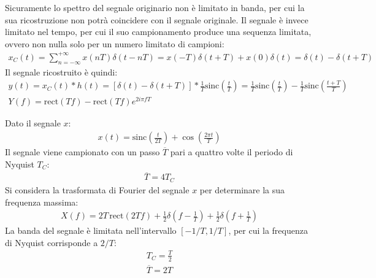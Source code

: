 \documentclass{article}
\begin{document}
Sicuramente lo spettro del segnale originario non è limitato in banda, per cui la sua ricostruzione non potrà coincidere con il segnale originale. Il segnale è invece limitato 
nel tempo, per cui il suo campionamento produce una sequenza limitata, ovvero non nulla solo per un numero limitato di campioni:
\begin{gather*}
    x_C(t)=\displaystyle\sum_{n=-\infty}^{+\infty}x(nT)\delta(t-nT)=x(-T)\delta(t+T)+x(0)\delta(t)=\delta(t)-\delta(t+T)
\end{gather*}
Il segnale ricostruito è quindi:
\begin{gather}
    y(t)=x_C(t)*h(t)=\left[\delta(t)-\delta(t+T)\right]*\frac{1}{T}\mbox{sinc}\left(\frac{t}{T}\right)=\frac{1}{T}\mbox{sinc}\left(\frac{t}{T}\right)-\frac{1}{T}\mbox{sinc}\left(\frac{t+T}{T}\right)\\
    Y(f)=\mbox{rect}(Tf)-\mbox{rect}(Tf)e^{2i\pi fT}
\end{gather}


Dato il segnale $x$:
\begin{gather*}
    x(t)=\mbox{sinc}\left(\displaystyle\frac{t}{2T}\right)+\cos\left(\frac{2\pi t}{T}\right)
\end{gather*}
Il segnale viene campionato con un passo $\overline{T}$ pari a quattro volte il periodo di Nyquist $T_C$:
\begin{gather*}
    \overline{T}=4T_C
\end{gather*}
Si considera la trasformata di Fourier del segnale $x$ per determinare la sua frequenza massima:
\begin{gather*}
    X(f)=2T\,\mbox{rect}(2Tf)+\displaystyle\frac{1}{2}\delta\left(f-\frac{1}{T}\right)+\frac{1}{2}\delta\left(f+\frac{1}{T}\right)
\end{gather*}
La banda del segnale è limitata nell'intervallo $[-1/T, 1/T]$, per cui la frequenza di Nyquist corrisponde a $2/T$:
\begin{gather*}
    T_C=\displaystyle\frac{T}{2}\\
    \overline{T}=2T
\end{gather*}
\end{document}
